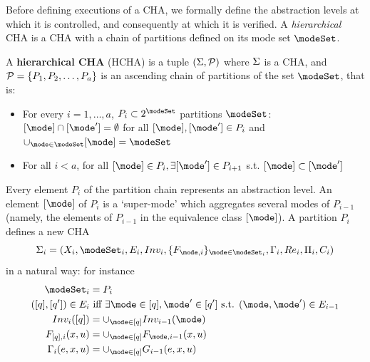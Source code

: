 Before defining executions of a CHA, we formally define the abstraction levels at which it is controlled, and consequently at which it is verified.
A \emph{hierarchical} CHA is a CHA with a chain of partitions defined on its mode set $\modeSet$.
\begin{defn}
	A \textbf{hierarchical CHA} (HCHA) is a tuple $(\Sigma, \mathcal{P})$ where $\Sigma$ is a CHA, and $\mathcal{P} = \{P_1,P_2,\ldots,P_a\}$ is an ascending chain of partitions of the set $\modeSet$, that is:
	\begin{itemize}
		\item For every $i =1,\ldots,a$, $P_i \subset 2^\modeSet$ partitions $\modeSet$: $[\mode] \cap [\mode'] = \emptyset$ for all $[\mode],[\mode'] \in P_i$ and $\cup_{\mode\in \modeSet}[\mode] = \modeSet$
		\item For all $i<a$, for all $[\mode]\in P_i, \exists [\mode'] \in P_{i+1}$ s.t. $[\mode] \subset [\mode']$ 
	\end{itemize}
\end{defn}

Every element $P_i$ of the partition chain represents an abstraction level. 
An element $[\mode]$ of $P_i$ is a `super-mode' which aggregates several modes of $P_{i-1}$ (namely, the elements of $P_{i-1}$ in the equivalence class $[\mode]$).
A partition $P_i$ defines a new CHA 
\[\Sys_i = (\stSet_i, \modeSet_i, E_i, Inv_i, \{F_{\mode,i}\}_{\mode \in \modeSet_i}, \guard_i, \reset_i, \funcOut_i, C_i)
\]
in a natural way: for instance 
\begin{eqnarray}
\modeSet_i &= P_i 
\\
([q],[q']) \in E_i &\text{ iff } \exists \mode \in [q], \mode' \in [q'] \text{ s.t. } (\mode,\mode') \in E_{i-1}
\\
Inv_i([q]) &= \cup_{\mode \in [q]}Inv_{i-1}(\mode)
\\
F_{[q],i}(x,u) &= \cup_{\mode \in [q]}F_{\mode,i-1}(x,u)
\\
\guard_i(e,x,u) & = \cup_{\mode \in [q]}G_{i-1}(e,x,u)
\end{eqnarray}


